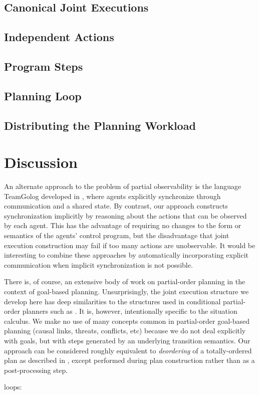 \subsection{Canonical Joint Executions}


\subsection{Independent Actions\label{sec:JointExec:IndepActs}}


\subsection{Program Steps}


\subsection{Planning Loop}


\subsection{Distributing the Planning Workload}


\section{Discussion\label{sec:JointExec:Discussion}}

An alternate approach to the problem of partial observability is the
language TeamGolog developed in \citep{farinelli07team_golog}, where
agents explicitly synchronize through communication and a shared state.
By contrast, our approach constructs synchronization implicitly by
reasoning about the actions that can be observed by each agent. This
has the advantage of requiring no changes to the form or semantics
of the agents' control program, but the disadvantage that joint execution
construction may fail if too many actions are unobservable. It would
be interesting to combine these approaches by automatically incorporating
explicit communication when implicit synchronization is not possible.

There is, of course, an extensive body of work on partial-order planning
in the context of goal-based planning. Unsurprisingly, the joint execution
structure we develop here has deep similarities to the structures
used in conditional partial-order planners such as \citep{peot92conditional_nonlinear}.
It is, however, intentionally specific to the situation calculus.
We make no use of many concepts common in partial-order goal-based
planning (causal links, threats, conflicts, etc) because we do not
deal explicitly with goals, but with steps generated by an underlying
transition semantics. Our approach can be considered roughly equivalent
to \emph{deordering} of a totally-ordered plan as described in \citep{backstrom99reordering},
except performed during plan construction rather than as a post-processing
step.

loops: \citep{levesque96what_is_planning,levesque05planning_with_loops}

